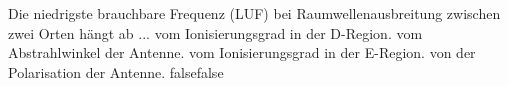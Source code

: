     {Die niedrigste brauchbare Frequenz (LUF) bei Raumwellenausbreitung zwischen zwei Orten hängt ab ...}
    {vom Ionisierungsgrad in der D-Region.}
    {vom Abstrahlwinkel der Antenne.}
    {vom Ionisierungsgrad in der E-Region.}
    {von der Polarisation der Antenne.}
    {false}{false}